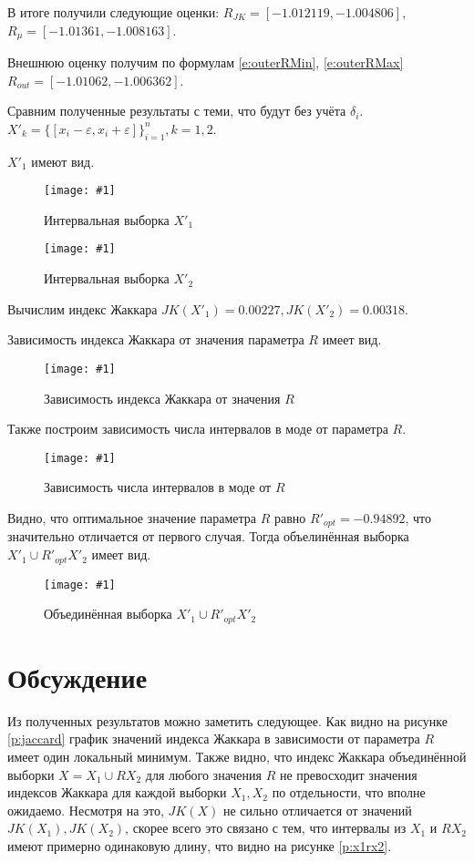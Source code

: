 \documentclass[a4paper,12pt]{article}
\newcommand{\plot}[3]{
    \begin{figure}[H]
        \begin{center}
            \texttt{[image: \#1]}
            \caption{#2}
            \label{#3}
        \end{center}
    \end{figure}
}
\begin{document}
    В итоге получили следующие оценки: $ R_{JK} = [-1.012119, -1.004806] $,
    $ R_{\mu} = [-1.01361, -1.008163] $.

    Внешнюю оценку получим по формулам \ref{e:outerRMin}, \ref{e:outerRMax}
    $ R_{out} = [-1.01062, -1.006362] $.

    Сравним полученные результаты с теми, что будут без учёта $ \delta_i $.
    $ X'_k = \{[x_i - \varepsilon, x_i + \varepsilon]\}^n_{i=1}, k = 1,2 $.

    $ X'_1 $ имеют вид.
    \plot{werr_X1}{Интервальная выборка $ X'_1 $}{p:werrX1}
    \plot{werr_X2}{Интервальная выборка $ X'_2 $}{p:werrX2}
    Вычислим индекс Жаккара $ JK(X'_1) = 0.00227, JK(X'_2) = 0.00318 $.

    Зависимость индекса Жаккара от значения параметра $ R $ имеет вид.
    \plot{werr_Jaccard}{Зависимость индекса Жаккара от значения $ R $}{p:werrJaccard}

    Также построим зависимость числа интервалов в моде от параметра $ R $.
    \plot{werr_ModaR}{Зависимость числа интервалов в моде от $ R $}{p:werrModa}

    Видно, что оптимальное значение параметра $ R $ равно $ R'_{opt} = -0.94892 $,
    что значительно отличается от первого случая. 
    Тогда объелинённая выборка $ X'_1 \cup R'_{opt} X'_2 $ имеет вид.
    \plot{werr_X1RX2}{Объединённая выборка $ X'_1 \cup R'_{opt} X'_2 $}{p:werrX1RX2}

    \section{Обсуждение}
    \quad Из полученных результатов можно заметить следующее.
    Как видно на рисунке \ref{p:jaccard} график значений индекса Жаккара
    в зависимости от параметра $ R $ имеет один локальный минимум.
    Также видно, что индекс Жаккара объединённой выборки $ X = X_1 \cup R X_2 $ для любого значения $ R $
    не превосходит значения индексов Жаккара для каждой выборки $ X_1, X_2 $ по отдельности, что вполне ожидаемо.
    Несмотря на это, $ JK(X) $ не сильно отличается от значений $ JK(X_1), JK(X_2) $,
    скорее всего это связано с тем, что интервалы из $ X_1 $ и $ R X_2 $ имеют примерно одинаковую длину,
    что видно на рисунке \ref{p:x1rx2}.

\end{document}
